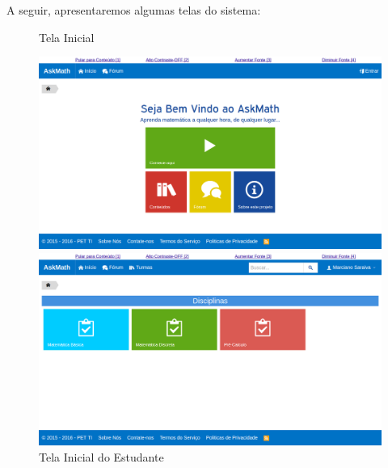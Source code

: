 A seguir, apresentaremos algumas telas do sistema:

\begin{figure}[h!]
  \centering
  \begin{minipage}[b]{0.49\textwidth}
	\caption{Tela Inicial}
    \includegraphics[width=\textwidth]{figuras/askmath/1}
  \end{minipage}
  \hfill
  \begin{minipage}[b]{0.49\textwidth}
	\caption{Tela Inicial do Estudante}
    \includegraphics[width=\textwidth]{figuras/askmath/2}
  \end{minipage}
 

\end{figure}
